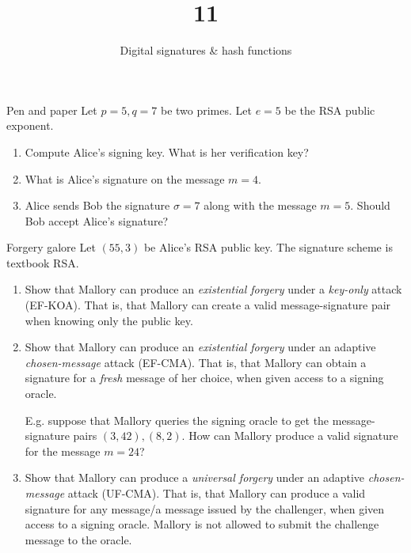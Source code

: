 \documentclass{practice}
\title{11}
\subtitle{Digital signatures \& hash functions}
\date{\DTMdate{2024-11-20}}
\begin{document}
\maketitle

\begin{task}{Pen and paper}
  Let $p = 5, q = 7$ be two primes.
  Let $e = 5$ be the RSA public exponent.
  \begin{enumerate}
    \item Compute Alice's signing key.
    What is her verification key?
    \item What is Alice's signature on the message $m = 4$.
    \item Alice sends Bob the signature $\sigma = 7$ along with the message $m = 5$.
    Should Bob accept Alice's signature?
  \end{enumerate}
\end{task}

\begin{task}{Forgery galore}
  Let $(55, 3)$ be Alice's RSA public key.
  The signature scheme is textbook RSA.
  \begin{enumerate}
    \item Show that Mallory can produce an \emph{existential forgery} under a \emph{key-only} attack (EF-KOA).
    That is, that Mallory can create a valid message-signature pair when knowing only the public key.
    \item Show that Mallory can produce an \emph{existential forgery} under an adaptive \emph{chosen-message} attack (EF-CMA).
    That is, that Mallory can obtain a signature for a \emph{fresh}\footnotemark{} message of her choice, when given access to a signing oracle.

    E.g. suppose that Mallory queries the signing oracle to get the message-signature pairs $(3, 42), (8, 2)$.
    How can Mallory produce a valid signature for the message $m = 24$?
    \item Show that Mallory can produce a \emph{universal forgery} under an adaptive \emph{chosen-message} attack (UF-CMA).
    That is, that Mallory can produce a valid signature for any message/a message issued by the challenger, when given access to a signing oracle.
    Mallory is not allowed to submit the challenge message to the oracle.
  \end{enumerate}
\end{task}
\end{document}
